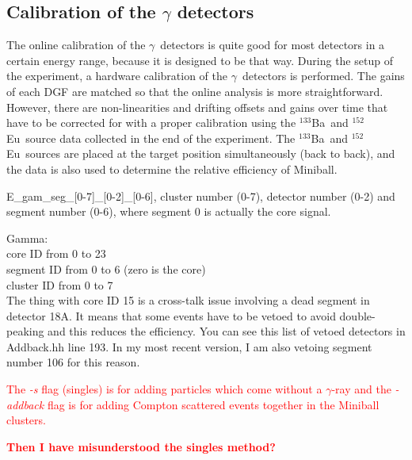 \documentclass[twoside,english]{uiofysmaster/uiofysmaster}
\newcommand{\ga}{$\gamma$}
\newcommand{\Ba}{$^{133}$Ba}
\newcommand{\Eu}{$^{152}$Eu}
\begin{document}
\subsection{Calibration of the \texorpdfstring{$\gamma$}{gamma} detectors}\label{sec:gamma}

The online calibration of the \ga\ detectors is quite good for most detectors in a certain energy range, because it is designed to be that way. 
During the setup of the experiment, a hardware calibration of the \ga\ detectors is performed. 
The gains of each DGF are matched so that the online analysis is more straightforward.
However, there are non-linearities and drifting offsets and gains over time that have to be corrected for with a proper calibration using the \Ba\ and \Eu\ source data collected in the end of the experiment. The \Ba\ and \Eu\ sources are placed at the target position simultaneously (back to back), and the data is also used to determine the relative efficiency of Miniball. 

\bigskip

E\_gam\_seg\_[0-7]\_[0-2]\_[0-6], cluster number (0-7), detector number (0-2) and segment number (0-6), where segment 0 is actually the core signal.

Gamma: \\
core ID from 0 to 23 \\
segment ID from 0 to 6 (zero is the core) \\
cluster ID from 0 to 7 \\

The thing with core ID 15 is a cross-talk issue involving a dead segment in detector 18A. It means that some events have to be vetoed to avoid double-peaking and this reduces the efficiency. You can see this list of vetoed detectors in Addback.hh line 193. In my most recent version, I am also vetoing segment number 106 for this reason.

\bigskip


\textcolor{red}{The \textit{-s} flag (singles) is for adding particles which come without a \ga-ray and the \textit{-addback} flag is for adding Compton scattered events together in the Miniball clusters.}

\textcolor{red}{\textbf{Then I have misunderstood the singles method?}}
\end{document}
